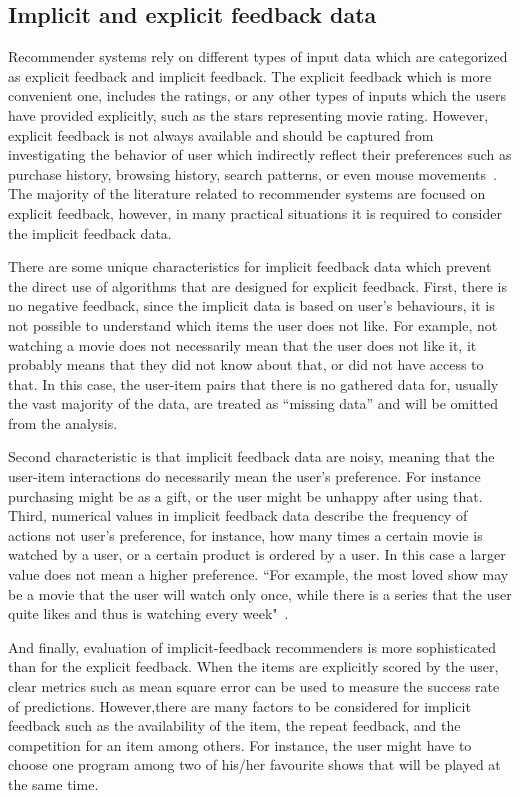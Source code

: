 \subsection{Implicit and explicit feedback data}

Recommender systems rely on different types of input data which are categorized as explicit feedback and implicit feedback.
The explicit feedback which is more convenient one, includes the ratings, or any other types of inputs which the users have provided explicitly, such as the stars representing movie rating. However, explicit feedback is not always available and should be captured from investigating the behavior of user which indirectly reflect their preferences such as purchase history, browsing history, search patterns, or even mouse movements~\cite{hu2008collaborative}. The majority of the literature related to recommender systems are focused on explicit feedback, however, in many practical situations it is required to consider the implicit feedback data. 

There are some unique characteristics for implicit feedback data  which prevent the direct use of algorithms that are designed for explicit feedback. First, there is no negative feedback, since the implicit data is based on user's behaviours, it is not possible to understand which items the user does not like. For example, not watching a movie does not necessarily mean that the user does not like it, it probably means that they did not know about that, or did not have access to that. In this case, the user-item pairs that there is no gathered data for, usually the vast
majority of the data, are treated as “missing data” and will be omitted from the analysis. 

Second characteristic is that implicit feedback data are noisy, meaning that the user-item interactions do necessarily mean the user's preference. For instance purchasing might be as a gift, or the user might be unhappy after using that. Third, numerical values in implicit feedback data describe the frequency of actions not user's preference, for instance, how many times a certain movie is watched by a user, or a certain product is ordered by a user. In this case a larger value does not mean a higher preference.
``For example, the most loved show may be a movie that the user will watch only once, while there is a series that the user quite likes and thus is watching every week"~\cite{hu2008collaborative}. 

And finally, evaluation of implicit-feedback recommenders is more sophisticated than for the explicit feedback. When the items are explicitly scored by the user, clear metrics such as mean square error can be used to measure the success rate of predictions. However,there are many factors to be considered for implicit feedback such as the availability of the item, the repeat feedback, and the competition for an item among others. For instance, the user might have to choose one program among two of his/her favourite shows that will be played at the same time.

